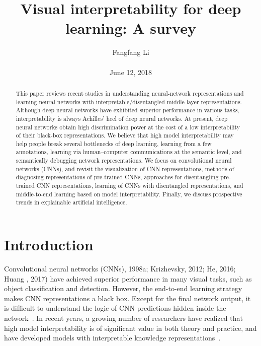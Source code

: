\documentclass[10pt,twocolumn,letterpaper]{article}
\begin{document}
\title{\textbf{Visual interpretability for deep learning: A survey }}
\author{Fangfang Li\\\\June 12, 2018}

\maketitle


\begin{abstract}

  This paper reviews recent studies in understanding neural-network representations and learning neural networks with interpretable/disentangled middle-layer representations. Although deep neural networks have exhibited superior performance in various tasks,  interpretability is always  Achilles’ heel of deep neural networks. At present, deep neural networks obtain high discrimination power at the cost of a low interpretability of their black-box representations. We believe that high model interpretability may help people break several bottlenecks of deep learning, learning from a few annotations, learning via human–computer communications at the semantic level, and semantically debugging network representations. We focus on convolutional neural networks (CNNs), and revisit the visualization of CNN representations, methods of diagnosing representations of pre-trained CNNs, approaches for disentangling pre-trained CNN representations, learning of CNNs with disentangled representations, and middle-to-end learning based on model interpretability. Finally, we discuss prospective trends in explainable artificial intelligence.
\end{abstract}
\section{Introduction}

Convolutional neural networks (CNNs), 1998a; Krizhevsky, 2012; He, 2016; Huang , 2017) have achieved superior performance in many visual tasks, such as object classiﬁcation and detection. However, the end-to-end learning strategy makes CNN representations a black box. Except for the ﬁnal network output, it is difﬁcult to understand the logic of CNN predictions hidden inside the network~\cite{krizhevsky2012imagenet}. In recent years, a growing number of researchers have realized that high model interpretability is of signiﬁcant value in both theory and practice, and have developed models with interpretable knowledge representations~\cite{plis2014deep}.
\end{document}
